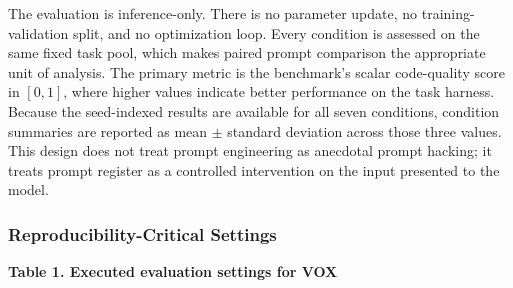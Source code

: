 \documentclass{article}
\begin{document}
The evaluation is inference-only. There is no parameter update, no training-validation split, and no optimization loop. Every condition is assessed on the same fixed task pool, which makes paired prompt comparison the appropriate unit of analysis. The primary metric is the benchmark's scalar code-quality score in \([0,1]\), where higher values indicate better performance on the task harness. Because the seed-indexed results are available for all seven conditions, condition summaries are reported as mean \(\pm\) standard deviation across those three values. This design does not treat prompt engineering as anecdotal prompt hacking; it treats prompt register as a controlled intervention on the input presented to the model.

\subsubsection{Reproducibility-Critical Settings}

\label{sec:reproducibility_critical_settings}

\textbf{Table 1. Executed evaluation settings for VOX}

\begin{table}[ht]
\centering
\caption{Hyperparameter settings}
\label{tab:1}
\end{table}
\end{document}
